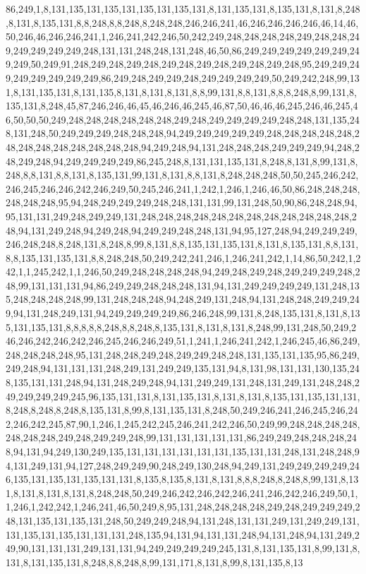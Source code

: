 86,249,1,8,131,135,131,135,131,135,131,135,131,8,131,135,131,8,135,131,8,131,8,248,8,131,8,135,131,8,8,248,8,8,248,8,248,248,246,246,241,46,246,246,246,246,46,14,46,50,246,46,246,246,241,1,246,241,242,246,50,242,249,248,248,248,248,249,248,248,249,249,249,249,249,248,131,131,248,248,131,248,46,50,86,249,249,249,249,249,249,249,249,50,249,91,248,249,248,249,248,249,248,249,248,249,248,249,248,95,249,249,249,249,249,249,249,249,86,249,248,249,249,248,249,249,249,249,50,249,242,248,99,131,8,131,135,131,8,131,135,8,131,8,131,8,131,8,8,99,131,8,8,131,8,8,8,248,8,99,131,8,135,131,8,248,45,87,246,246,46,45,46,246,46,245,46,87,50,46,46,46,245,246,46,245,46,50,50,50,249,248,248,248,248,248,248,249,248,249,249,249,249,248,248,131,135,248,131,248,50,249,249,249,248,248,248,94,249,249,249,249,249,248,248,248,248,248,248,248,248,248,248,248,248,248,94,249,248,94,131,248,248,248,249,249,249,94,248,248,249,248,94,249,249,249,249,86,245,248,8,131,131,135,131,8,248,8,131,8,99,131,8,248,8,8,131,8,8,131,8,135,131,99,131,8,131,8,8,131,8,248,248,248,50,50,245,246,242,246,245,246,246,242,246,249,50,245,246,241,1,242,1,246,1,246,46,50,86,248,248,248,248,248,248,95,94,248,249,249,249,248,248,131,131,99,131,248,50,90,86,248,248,94,95,131,131,249,248,249,249,131,248,248,248,248,248,248,248,248,248,248,248,248,248,94,131,249,248,94,249,248,94,249,249,248,248,131,94,95,127,248,94,249,249,249,246,248,248,8,248,131,8,248,8,99,8,131,8,8,135,131,135,131,8,131,8,135,131,8,8,131,8,8,135,131,135,131,8,8,248,248,50,249,242,241,246,1,246,241,242,1,14,86,50,242,1,242,1,1,245,242,1,1,246,50,249,248,248,248,248,94,249,248,249,248,249,249,249,248,248,99,131,131,131,94,86,249,249,248,248,248,131,94,131,249,249,249,249,131,248,135,248,248,248,248,99,131,248,248,248,94,248,249,131,248,94,131,248,248,249,249,249,94,131,248,249,131,94,249,249,249,249,86,246,248,99,131,8,248,135,131,8,131,8,135,131,135,131,8,8,8,8,8,248,8,8,248,8,135,131,8,131,8,131,8,248,99,131,248,50,249,246,246,242,246,242,246,245,246,246,249,51,1,241,1,246,241,242,1,246,245,46,86,249,248,248,248,248,95,131,248,248,249,248,249,249,248,248,131,135,131,135,95,86,249,249,248,94,131,131,131,248,249,131,249,249,135,131,94,8,131,98,131,131,130,135,248,135,131,131,248,94,131,248,249,248,94,131,249,249,131,248,131,249,131,248,248,249,249,249,249,245,96,135,131,131,8,131,135,131,8,131,8,131,8,135,131,135,131,131,8,248,8,248,8,248,8,135,131,8,99,8,131,135,131,8,248,50,249,246,241,246,245,246,242,246,242,245,87,90,1,246,1,245,242,245,246,241,242,246,50,249,99,248,248,248,248,248,248,248,249,248,249,249,248,99,131,131,131,131,131,86,249,249,248,248,248,248,94,131,94,249,130,249,135,131,131,131,131,131,131,135,131,131,248,131,248,248,94,131,249,131,94,127,248,249,249,90,248,249,130,248,94,249,131,249,249,249,249,246,135,131,135,131,135,131,131,8,135,8,135,8,131,8,131,8,8,8,248,8,248,8,99,131,8,131,8,131,8,131,8,131,8,248,248,50,249,246,242,246,242,246,241,246,242,246,249,50,1,1,246,1,242,242,1,246,241,46,50,249,8,95,131,248,248,248,248,249,248,249,249,249,248,131,135,131,135,131,248,50,249,249,248,94,131,248,131,131,249,131,249,249,131,131,135,131,135,131,131,131,248,135,94,131,94,131,131,248,94,131,248,94,131,249,249,90,131,131,131,249,131,131,94,249,249,249,249,245,131,8,131,135,131,8,99,131,8,131,8,131,135,131,8,248,8,8,248,8,99,131,171,8,131,8,99,8,131,135,8,13
